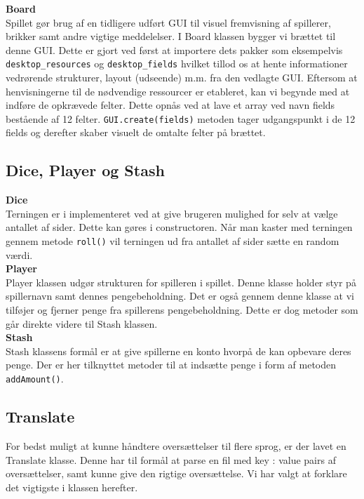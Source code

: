 \noindent\textbf{Board}\\

\noindent Spillet gør brug af en tidligere udført GUI til visuel fremvisning af spillerer, brikker samt andre vigtige meddelelser.
I Board klassen bygger vi brættet til denne GUI.
Dette er gjort ved først at importere dets pakker som eksempelvis \lstinline{desktop_resources} og \lstinline{desktop_fields} hvilket tillod os at hente informationer vedrørende strukturer, layout (udseende) m.m. fra den vedlagte GUI.
Eftersom at henvisningerne til de nødvendige ressourcer er etableret, kan vi begynde med at indføre de opkrævede felter.
Dette opnås ved at lave et array ved navn fields bestående af 12 felter.
\lstinline{GUI.create(fields)} metoden tager udgangspunkt i de 12 fields og derefter skaber visuelt de omtalte felter på brættet.
\\


\subsection{Dice, Player og Stash}

\textbf{Dice}\\
\noindent Terningen er i implementeret ved at give brugeren mulighed for selv at vælge antallet af sider.
Dette kan gøres i constructoren.
Når man kaster med terningen gennem metode \lstinline{roll()} vil terningen ud fra antallet af sider sætte en random værdi.
\\

\noindent\textbf{Player}\\
\noindent Player klassen udgør strukturen for spilleren i spillet.
Denne klasse holder styr på spillernavn samt dennes pengebeholdning.
Det er også gennem denne klasse at vi tilføjer og fjerner penge fra spillerens pengebeholdning.
Dette er dog metoder som går direkte videre til Stash klassen.
\\

\noindent\textbf{Stash}\\
Stash klassens formål er at give spillerne en konto hvorpå de kan opbevare deres penge.
Der er her tilknyttet metoder til at indsætte penge i form af metoden \lstinline{addAmount()}.


\subsection{Translate}

For bedst muligt at kunne håndtere oversættelser til flere sprog, er der lavet en Translate klasse.
Denne har til formål at parse en fil med key : value pairs af oversættelser, samt kunne give den rigtige oversættelse.
Vi har valgt at forklare det vigtigste i klassen herefter.
\\

